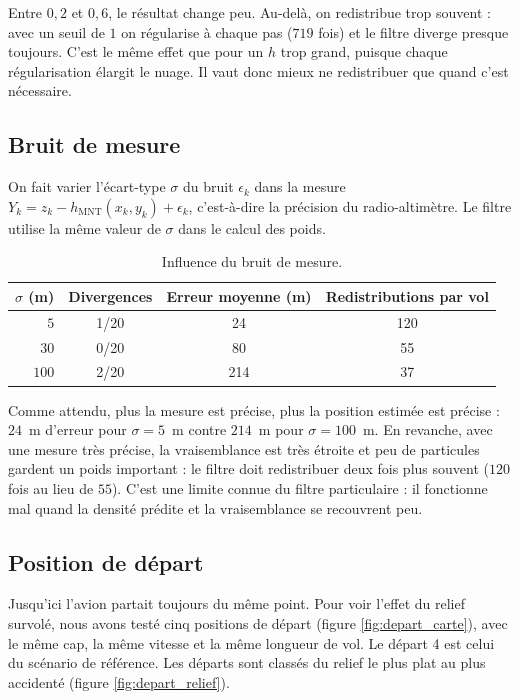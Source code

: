 \documentclass[11pt]{article}
\begin{document}
Entre $0{,}2$ et $0{,}6$, le résultat change peu. Au-delà, on redistribue trop
souvent : avec un seuil de $1$ on régularise à chaque pas ($719$ fois) et le filtre
diverge presque toujours. C'est le même effet que pour un $h$ trop grand, puisque
chaque régularisation élargit le nuage. Il vaut donc mieux ne redistribuer que quand
c'est nécessaire.

\subsection{Bruit de mesure}

On fait varier l'écart-type $\sigma$ du bruit $\epsilon_k$ dans la mesure
$Y_k = z_k - h_{\mathrm{MNT}}(x_k, y_k) + \epsilon_k$, c'est-à-dire la précision du
radio-altimètre. Le filtre utilise la même valeur de $\sigma$ dans le calcul des poids.

\begin{table}[H]
\centering
\begin{tabular}{rccc}
\toprule
$\sigma$ (m) & Divergences & Erreur moyenne (m) & Redistributions par vol \\
\midrule
$5$ & 1/20 & 24 & 120 \\
$30$ & 0/20 & 80 & 55 \\
$100$ & 2/20 & 214 & 37 \\
\bottomrule
\end{tabular}
\caption{Influence du bruit de mesure.}
\end{table}

Comme attendu, plus la mesure est précise, plus la position estimée est précise :
$24$~m d'erreur pour $\sigma = 5$~m contre $214$~m pour $\sigma = 100$~m. En revanche,
avec une mesure très précise, la vraisemblance est très étroite et peu de particules
gardent un poids important : le filtre doit redistribuer deux fois plus souvent
($120$ fois au lieu de $55$). C'est une limite connue du filtre particulaire : il fonctionne mal quand la densité
prédite et la vraisemblance se recouvrent peu.

\subsection{Position de départ}

Jusqu'ici l'avion partait toujours du même point. Pour voir l'effet du relief survolé,
nous avons testé cinq positions de départ (figure \ref{fig:depart_carte}), avec le
même cap, la même vitesse et la même longueur de vol. Le départ 4 est celui du
scénario de référence. Les départs sont classés du relief le plus plat au plus accidenté
(figure \ref{fig:depart_relief}).
\end{document}
